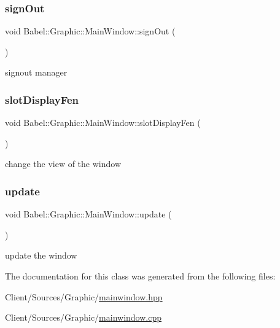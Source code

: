 \subsubsection{\texorpdfstring{sign\+Out}{signOut}}
{\footnotesize\ttfamily void Babel\+::\+Graphic\+::\+Main\+Window\+::sign\+Out (\begin{DoxyParamCaption}{ }\end{DoxyParamCaption})\hspace{0.3cm}{\ttfamily [slot]}}

signout manager \mbox{\label{classBabel_1_1Graphic_1_1MainWindow_ae0f5be307c0f9810876ca66b616f55b1}} 
\subsubsection{\texorpdfstring{slot\+Display\+Fen}{slotDisplayFen}}
{\footnotesize\ttfamily void Babel\+::\+Graphic\+::\+Main\+Window\+::slot\+Display\+Fen (\begin{DoxyParamCaption}{ }\end{DoxyParamCaption})\hspace{0.3cm}{\ttfamily [slot]}}

change the view of the window \mbox{\label{classBabel_1_1Graphic_1_1MainWindow_a86fb4e755f46d1e6bb8f5d4b7b4d8297}} 
\subsubsection{\texorpdfstring{update}{update}}
{\footnotesize\ttfamily void Babel\+::\+Graphic\+::\+Main\+Window\+::update (\begin{DoxyParamCaption}{ }\end{DoxyParamCaption})\hspace{0.3cm}{\ttfamily [slot]}}

update the window 

The documentation for this class was generated from the following files\+:\begin{DoxyCompactItemize}
\item 
Client/\+Sources/\+Graphic/\hyperlink{mainwindow_8hpp}{mainwindow.\+hpp}\item 
Client/\+Sources/\+Graphic/\hyperlink{mainwindow_8cpp}{mainwindow.\+cpp}\end{DoxyCompactItemize}
